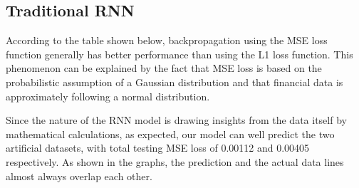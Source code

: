 \documentclass[letterpaper, 10 pt, conference]{ieeeconf}  %
\begin{document}
    \begin{table*}[t]
        \centering
        \caption{Table containing the final loss (MSE and L1) of testing and training after 50 epochs for LSTM.}
    \end{table*}

    \subsection{Traditional RNN}
        According to the table shown below, backpropagation using the MSE loss function generally has better performance than using the L1 loss function. This phenomenon can be explained by the fact that MSE loss is based on the probabilistic assumption of a Gaussian distribution and that financial data is approximately following a normal distribution. 
    
        Since the nature of the RNN model is drawing insights from the data itself by mathematical calculations, as expected, our model can well predict the two artificial datasets, with total testing MSE loss of 0.00112 and 0.00405 respectively. As shown in the graphs, the prediction and the actual data lines almost always overlap each other.  
    
\end{document}
